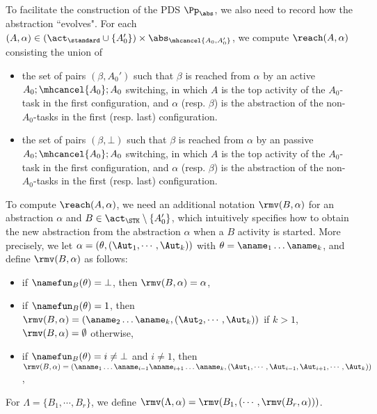 To facilitate the construction of the PDS $\Pp_{\abs}$, we also need to record how the abstraction ``evolves". For each $(A, \alpha) \in (\act_{\standard}\cup\{A_0'\}) \times \abs_{\mhcancel{A_0,A_0'}}$, 
we compute $\reach(A, \alpha)$ consisting the union of 
\begin{itemize}
    \item the set of pairs $(\beta,A_0')$ such that $\beta$ is reached from $\alpha$ by an active $A_0; \mhcancel{A_0}; A_0$ switching, in which $A$ is the top activity of the $A_0$-task in the first configuration, 
    and $\alpha$ (resp. $\beta$) is the abstraction of the non-$A_0$-tasks in the first (resp. last) configuration.
    \item the set of pairs $(\beta,\bot)$ such that $\beta$ is reached from $\alpha$ by an passive $A_0; \mhcancel{A_0}; A_0$ switching, in which $A$ is the top activity of the $A_0$-task in the first configuration,
    and $\alpha$ (resp. $\beta$) is the abstraction of the non-$A_0$-tasks in the first (resp. last) configuration.
\end{itemize}

To compute $\reach(A,\alpha)$, we need an additional notation $\rmv(B,\alpha)$ for an abstraction $\alpha$ and $B\in\act_{\STK}\setminus\{A_0'\}$, which intuitively specifies how to obtain the new abstraction from the abstraction $\alpha$ when a $B$ activity is started. More precisely, we let $\alpha = (\theta, (\Aut_1,\cdots, \Aut_k))$ with $\theta = \aname_1\dots\aname_k$, and define $\rmv(B,\alpha)$ as follows:
\begin{itemize}
    \item if $\namefun_B(\theta) = \bot$, then $\rmv(B,\alpha) = \alpha$,
    \item if $\namefun_B(\theta) = 1$, then $\rmv(B,\alpha) = (\aname_2\dots\aname_k,(\Aut_2,\cdots,\Aut_k))$ if $k>1$, $\rmv(B,\alpha) = \emptyset$ otherwise,
    \item if $\namefun_B(\theta) = i\neq \bot$ and $i\neq 1$, then $\rmv(B,\alpha) = (\aname_1\dots\aname_{i-1}\aname_{i+1}\dots\aname_k,(\Aut_1,\cdots,\Aut_{i-1},\Aut_{i+1},\cdots,\Aut_{k}))$,
\end{itemize}
For $\Lambda = \{B_1,\cdots,B_r\}$, we define $\rmv(\Lambda,\alpha) = \rmv(B_1,(\cdots,\rmv(B_r,\alpha)))$.


